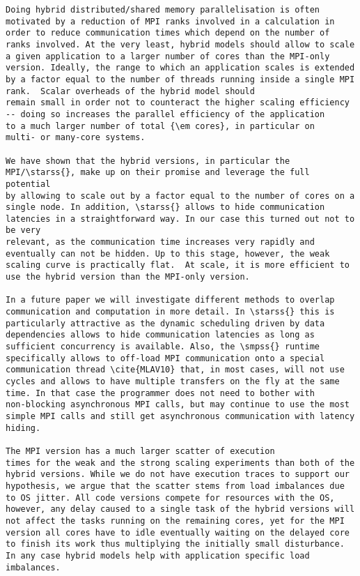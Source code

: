 \documentclass[conference]{IEEEtran}
\newcommand{\starss}{{StarSs}}
\newcommand{\smpss}{{SMPSs}}
\begin{document}
\begin{lstlisting}
Doing hybrid distributed/shared memory parallelisation is often
motivated by a reduction of MPI ranks involved in a calculation in
order to reduce communication times which depend on the number of
ranks involved. At the very least, hybrid models should allow to scale
a given application to a larger number of cores than the MPI-only
version. Ideally, the range to which an application scales is extended
by a factor equal to the number of threads running inside a single MPI
rank.  Scalar overheads of the hybrid model should
remain small in order not to counteract the higher scaling efficiency
-- doing so increases the parallel efficiency of the application
to a much larger number of total {\em cores}, in particular on
multi- or many-core systems.

We have shown that the hybrid versions, in particular the
MPI/\starss{}, make up on their promise and leverage the full potential
by allowing to scale out by a factor equal to the number of cores on a
single node. In addition, \starss{} allows to hide communication
latencies in a straightforward way. In our case this turned out not to be very
relevant, as the communication time increases very rapidly and
eventually can not be hidden. Up to this stage, however, the weak
scaling curve is practically flat.  At scale, it is more efficient to
use the hybrid version than the MPI-only version.
 
In a future paper we will investigate different methods to overlap
communication and computation in more detail. In \starss{} this is
particularly attractive as the dynamic scheduling driven by data
dependencies allows to hide communication latencies as long as
sufficient concurrency is available. Also, the \smpss{} runtime
specifically allows to off-load MPI communication onto a special
communication thread \cite{MLAV10} that, in most cases, will not use
cycles and allows to have multiple transfers on the fly at the same
time. In that case the programmer does not need to bother with
non-blocking asynchronous MPI calls, but may continue to use the most
simple MPI calls and still get asynchronous communication with latency
hiding.

The MPI version has a much larger scatter of execution
times for the weak and the strong scaling experiments than both of the
hybrid versions. While we do not have execution traces to support our
hypothesis, we argue that the scatter stems from load imbalances due
to OS jitter. All code versions compete for resources with the OS,
however, any delay caused to a single task of the hybrid versions will
not affect the tasks running on the remaining cores, yet for the MPI
version all cores have to idle eventually waiting on the delayed core
to finish its work thus multiplying the initially small disturbance.   
In any case hybrid models help with application specific load
imbalances.


\end{lstlisting}
\end{document}
